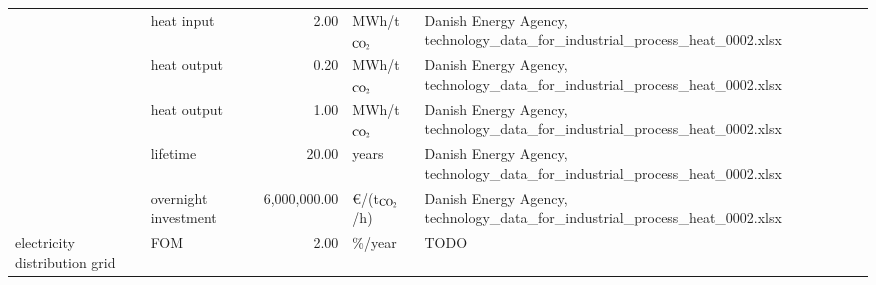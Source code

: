 \begin{longtable}{p{4cm}p{4cm}rp{3cm}p{10cm}}
                      & heat input &         2.00 &            MWh/t$_{\ce{CO2}}$ &                                                                                                                                                                                                                                                    Danish Energy Agency, technology\_data\_for\_industrial\_process\_heat\_0002.xlsx \\
                      & heat output &         0.20 &            MWh/t$_{\ce{CO2}}$ &                                                                                                                                                                                                                                                    Danish Energy Agency, technology\_data\_for\_industrial\_process\_heat\_0002.xlsx \\
                      & heat output &         1.00 &            MWh/t$_{\ce{CO2}}$ &                                                                                                                                                                                                                                                    Danish Energy Agency, technology\_data\_for\_industrial\_process\_heat\_0002.xlsx \\
                      & lifetime &        20.00 &                         years &                                                                                                                                                                                                                                                    Danish Energy Agency, technology\_data\_for\_industrial\_process\_heat\_0002.xlsx \\
                      & overnight investment & 6,000,000.00 &      \euro/(t$_{\ce{CO2}}$/h) &                                                                                                                                                                                                                                                    Danish Energy Agency, technology\_data\_for\_industrial\_process\_heat\_0002.xlsx \\
electricity distribution grid & FOM &         2.00 &                       \%/year &                                                                                                                                                                                                                                                                                                                                 TODO \\

\end{longtable}

